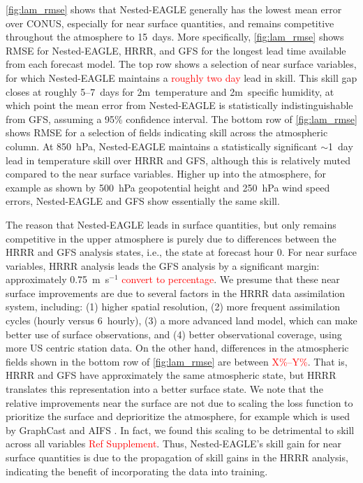 \documentclass[11pt]{article}
\newcommand{\red}[1]{\textcolor{red}{#1}}
\begin{document}
\cref{fig:lam_rmse} shows that Nested-EAGLE generally has the lowest mean error over
CONUS, especially for near surface quantities, and remains competitive
throughout the atmosphere to 15~days.
More specifically, \cref{fig:lam_rmse} shows RMSE for Nested-EAGLE, HRRR, and
GFS for the longest lead time available from each forecast model.
The top row shows a selection of near surface variables, for which Nested-EAGLE
maintains a \red{roughly two day} lead in skill.
This skill gap closes at roughly 5--7~days for 2m~temperature and
2m~specific humidity, at which point the mean error from Nested-EAGLE is
statistically indistinguishable from GFS, assuming a 95\% confidence interval.
The bottom row of \cref{fig:lam_rmse} shows RMSE for a selection of fields
indicating skill across the atmospheric column.
At 850~hPa, Nested-EAGLE maintains a statistically significant
$\sim$1~day
lead in temperature skill over HRRR and GFS, although this is relatively muted compared to
the near surface variables.
Higher up into the atmosphere, for example as shown by 500~hPa geopotential
height and 250~hPa wind speed errors, Nested-EAGLE and GFS show essentially the
same skill.

The reason that Nested-EAGLE leads in surface quantities, but only remains
competitive in the upper atmosphere is purely due to differences between the
HRRR and GFS analysis states, i.e., the state at forecast hour 0.
For near surface variables, HRRR analysis leads the GFS analysis by a
significant margin: approximately 0.75~m~s$^{-1}$ \red{convert to
percentage}.
We presume that these near surface improvements are due to several factors in
the HRRR data assimilation system, including:
(1) higher spatial resolution,
(2) more frequent assimilation cycles (hourly versus 6~hourly),
(3) a more advanced land model, which can make better use of surface
observations,
and (4) better observational coverage, using more US centric station data.
On the other hand, differences in the atmospheric fields shown in the bottom row
of \cref{fig:lam_rmse} are between \red{X\%--Y\%}.
That is, HRRR and GFS have approximately the same atmospheric state, but HRRR
translates this representation into a better surface state.
We note that the relative improvements near the surface are not due to scaling
the loss function to prioritize the surface and deprioritize the atmosphere,
for example which is used by
GraphCast \citep{lam_learning_2023} and AIFS \citep{lang_aifs_2024}.
In fact, we found this scaling to be detrimental to skill across all variables
\red{Ref Supplement}.
Thus, Nested-EAGLE's skill gain for near surface quantities is due to the
propagation of skill gains in the HRRR analysis, indicating the benefit of
incorporating the data into training.
\end{document}
